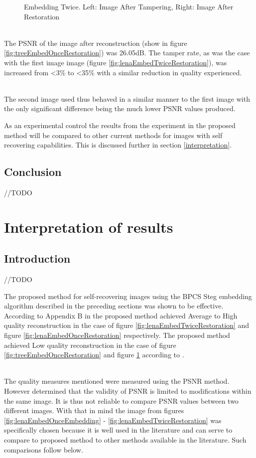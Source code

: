 \documentclass[12pt]{article}
\begin{document}
\begin{figure}[h]
{}%
\caption{Embedding Twice. Left: Image After Tampering, Right: Image After Restoration}
\label{fig:treeEmbedTwiceRestoration}
\end{figure}

\hspace{0pt} \\
The PSNR of the image after reconstruction (show in figure \ref{fig:treeEmbedOnceRestoration}) was 26.05dB.
The tamper rate, as was the case with the first image image (figure \ref{fig:lenaEmbedTwiceRestoration}), was increased from \textless 3\% to \textless 35\% with a similar reduction in quality experienced.

\hspace{0pt} \\
The second image used thus behaved in a similar manner to the first image with the only significant difference being the much lower PSNR values produced.

As an experimental control the results from the experiment in the proposed method will be compared to other current methods for images with self recovering capabilities.
This is discussed further in  section \ref{interpretation}.
\subsection{Conclusion}
//TODO 


\section{Interpretation of results}
\subsection{Introduction}
//TODO

\label{interpretation}
The proposed method for self-recovering images using the BPCS Steg embedding algorithm described in the preceding sections was shown to be effective.
According to Appendix B in \cite{korus2013efficient} the proposed method achieved Average to High quality reconstruction in the case of figure \ref{fig:lenaEmbedTwiceRestoration} and figure \ref{fig:lenaEmbedOnceRestoration} respectively.
The proposed method achieved Low quality reconstruction in the case of figure \ref{fig:treeEmbedOnceRestoration} and figure \ref{fig:treeEmbedTwiceRestoration} according to \cite{korus2013efficient}.

\hspace{0pt} \\
The quality measures mentioned were measured using the PSNR method. \cite{huynh2008scope} However determined that the validity of PSNR is limited to modifications within the same image.
It is thus not reliable to compare PSNR values between two different images.
With that in mind the image from figures \ref{fig:lenaEmbedOnceEmbedding} - \ref{fig:lenaEmbedTwiceRestoration} was specifically chosen because it is well used in the literature and can serve to compare to proposed method to other methods available in the literature.
Such comparisons follow below. 
\end{document}
